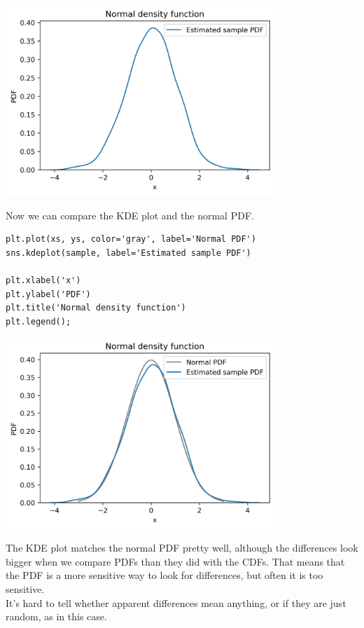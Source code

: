 \begin{center}
\includegraphics[width=4in]{chapters/08_distributions_files/08_distributions_122_0.png}
\end{center}

Now we can compare the KDE plot and the normal PDF.

\begin{lstlisting}[]
plt.plot(xs, ys, color='gray', label='Normal PDF')
sns.kdeplot(sample, label='Estimated sample PDF')

plt.xlabel('x')
plt.ylabel('PDF')
plt.title('Normal density function')
plt.legend();
\end{lstlisting}

\begin{center}
\includegraphics[width=4in]{chapters/08_distributions_files/08_distributions_124_0.png}
\end{center}

The KDE plot matches the normal PDF pretty well, although the
differences look bigger when we compare PDFs than they did with the
CDFs. That means that the PDF is a more sensitive way to look for
differences, but often it is too sensitive.\\
It's hard to tell whether apparent differences mean anything, or if they
are just random, as in this case.

